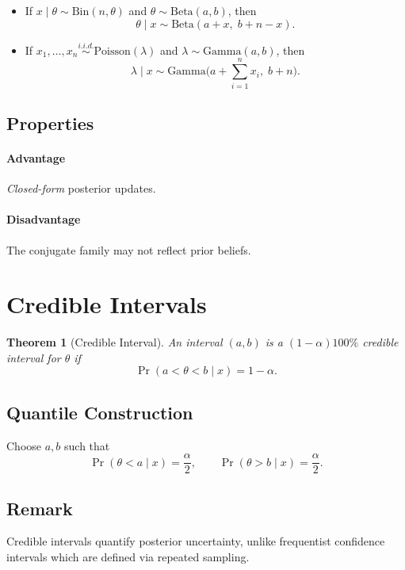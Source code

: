 \documentclass[12pt,oneside]{book}
\numberwithin{equation}{section}
\theoremstyle{definition}
\theoremstyle{plain}
\newtheorem{theorem}{Theorem}[section]
\theoremstyle{remark}
\begin{document}
\begin{itemize}
\item If $x \mid \theta \sim \mathrm{Bin}(n,\theta)$ and $\theta \sim \mathrm{Beta}(a,b)$, then
\[
\theta \mid x \sim \mathrm{Beta}(a + x,\; b + n - x).
\]

\item If $x_1,\ldots,x_n \stackrel{i.i.d.}{\sim} \mathrm{Poisson}(\lambda)$ and $\lambda \sim \mathrm{Gamma}(a,b)$, then
\[
\lambda \mid x \sim \mathrm{Gamma}\bigl(a + \textstyle\sum_{i=1}^n x_i,\; b + n\bigr).
\]
\end{itemize}

\subsection{Properties}

\paragraph{Advantage}
\emph{Closed-form} posterior updates.

\paragraph{Disadvantage}
The conjugate family may not reflect prior beliefs.

\section{Credible Intervals}

\begin{theorem}[Credible Interval]
An interval $(a,b)$ is a $(1-\alpha)100\%$ credible interval for $\theta$ if
\[
\Pr(a < \theta < b \mid x) = 1 - \alpha.
\]
\end{theorem}

\subsection*{Quantile Construction}

Choose $a,b$ such that
\[
\Pr(\theta < a \mid x) = \frac{\alpha}{2},
\qquad
\Pr(\theta > b \mid x) = \frac{\alpha}{2}.
\]

\subsection*{Remark}

Credible intervals quantify posterior uncertainty, unlike frequentist confidence intervals which are defined via repeated sampling.
\end{document}

